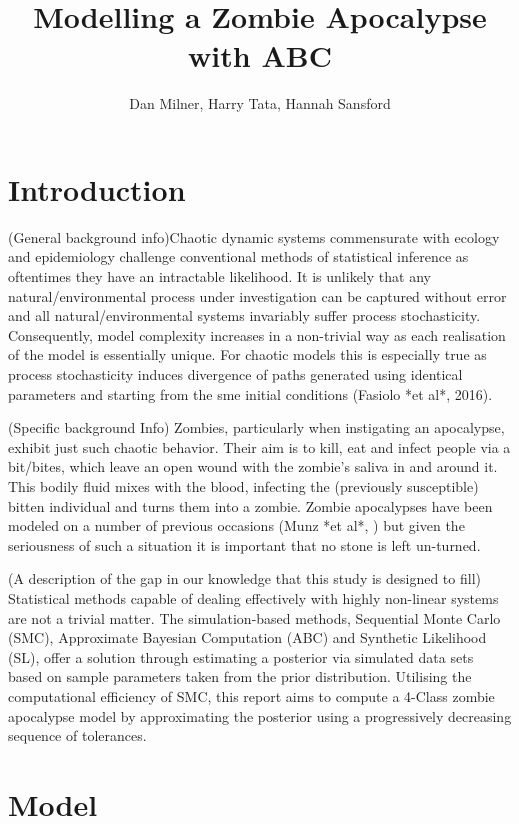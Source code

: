 \documentclass[]{article}
\title{Modelling a Zombie Apocalypse with ABC}
\author{Dan Milner, Harry Tata, Hannah Sansford}
\begin{document}

\maketitle

\section{Introduction}

(General background info)Chaotic dynamic systems commensurate with ecology and epidemiology challenge conventional methods of statistical inference as oftentimes they have an intractable likelihood. It is unlikely that any natural/environmental process under investigation can be captured without error and all natural/environmental systems invariably suffer process stochasticity. Consequently, model complexity increases in a non-trivial way as each realisation of the model is essentially unique. For chaotic models this is especially true as process stochasticity induces divergence of paths generated using identical parameters and starting from the sme initial conditions (Fasiolo *et al*, 2016).

(Specific background Info) Zombies, particularly when instigating an apocalypse, exhibit just such chaotic behavior. Their aim is to kill, eat and infect people via a bit/bites, which leave an open wound with the zombie's saliva in and around it. This bodily fluid mixes with the blood, infecting the (previously susceptible) bitten individual and turns them into a zombie. Zombie apocalypses have been modeled on a number of previous occasions (Munz *et al*, ) but given the seriousness of such a situation it is important that no stone is left un-turned. 

(A description of the gap in our knowledge that this study is designed to fill) Statistical methods capable of dealing effectively with highly non-linear systems are not a trivial matter. The simulation-based methods, Sequential Monte Carlo (SMC), Approximate Bayesian Computation (ABC) and Synthetic Likelihood (SL), offer a solution through estimating a posterior via simulated data sets based on sample parameters taken from the prior distribution. Utilising the computational efficiency of SMC, this report aims to compute a 4-Class zombie apocalypse model by approximating the posterior using a progressively decreasing sequence of tolerances. 


\section{Model}
\label{model}
\end{document}
